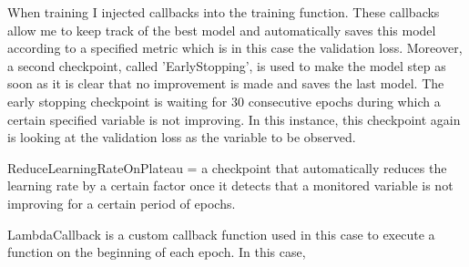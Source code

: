 When training I injected callbacks into the training function. These callbacks allow me to keep track of the best model and automatically saves this model according to a specified metric which is in this case the validation loss.\newline
Moreover, a second checkpoint, called 'EarlyStopping', is used to make the model step as soon as it is clear that no improvement is made and saves the last model. The early stopping checkpoint is waiting for 30 consecutive epochs during which a certain specified variable is not improving. In this instance, this checkpoint again is looking at the validation loss as the variable to be observed.

ReduceLearningRateOnPlateau = a checkpoint that automatically reduces the learning rate by a certain factor once it detects that a monitored variable is not improving for a certain period of epochs.

LambdaCallback is a custom callback function used in this case to execute a function on the beginning of each epoch. In this case, 


	